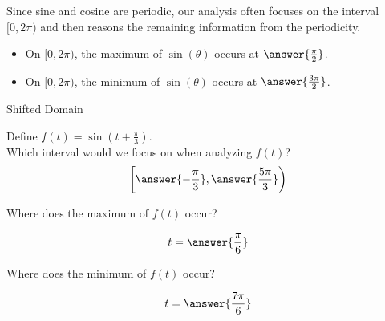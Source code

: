 \documentclass{ximera}
\author{Lee Wayand}
\begin{document}
\begin{exercise}





Since sine and cosine are periodic, our analysis often focuses on the interval $[0, 2\pi)$ and then reasons the remaining information from the periodicity.  \\

\begin{itemize}
\item On $[0, 2\pi)$, the maximum of $\sin(\theta)$ occurs at $\answer{\frac{\pi}{2}}$. 
\item On $[0, 2\pi)$, the minimum of $\sin(\theta)$ occurs at $\answer{\frac{3\pi}{2}}$. 
\end{itemize}










\begin{question} Shifted Domain 

Define $f(t) = \sin\left(t + \frac{\pi}{3} \right)$. \\




Which interval would we focus on when analyzing $f(t)$? \\

\[
\left[      \answer{-\frac{\pi}{3}},   \answer{\frac{5\pi}{3}}     \right)
\]




Where does the maximum of $f(t)$ occur?

\[
t = \answer{\frac{\pi}{6}} 
\]





Where does the minimum of $f(t)$ occur?

\[
t = \answer{\frac{7\pi}{6}} 
\]



\end{question}


















\end{exercise}
\end{document}
